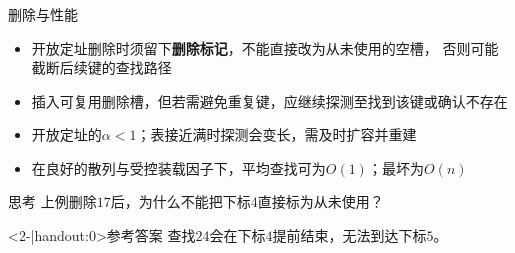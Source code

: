 \begin{frame}
    \frametitle{\insertsectionhead}
    \begin{block}{删除与性能}
        \begin{itemize}
            \item 开放定址删除时须留下\textbf{删除标记}，不能直接改为从未使用的空槽，
                  否则可能截断后续键的查找路径
            \item 插入可复用删除槽，但若需避免重复键，应继续探测至找到该键或确认不存在
            \item 开放定址的$\alpha<1$；表接近满时探测会变长，需及时扩容并重建
            \item 在良好的散列与受控装载因子下，平均查找可为$O(1)$；最坏为$O(n)$
        \end{itemize}
    \end{block}
    \begin{alertblock}{思考}
        上例删除$17$后，为什么不能把下标$4$直接标为从未使用？
    \end{alertblock}
    \begin{block}<2-|handout:0>{参考答案}
        查找$24$会在下标$4$提前结束，无法到达下标$5$。
    \end{block}
\end{frame}
